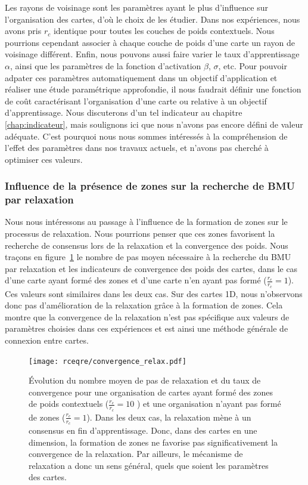 \documentclass[../main]{subfiles}
\begin{document}
Les rayons de voisinage sont les paramètres ayant le plus d'influence sur l'organisation des cartes, d'où le choix de les étudier.
Dans nos expériences, nous avons pris $r_c$ identique pour toutes les couches de poids contextuels.
Nous pourrions cependant associer à chaque couche de poids d'une carte un rayon de voisinage différent. 
Enfin, nous pouvons aussi faire varier le taux d'apprentissage $\alpha$, ainsi que les paramètres de la fonction d'activation $\beta$, $\sigma$, etc.
Pour pouvoir adpater ces paramètres automatiquement dans un objectif d'application et réaliser une étude paramétrique approfondie, il nous faudrait définir une fonction de coût caractérisant l'organisation d'une carte ou relative à un objectif d'apprentissage. 
Nous discuterons d'un tel indicateur au chapitre \ref{chap:indicateur}, mais soulignons ici que nous n'avons pas encore défini de valeur adéquate. 
C'est pourquoi nous nous sommes intéressés à la compréhension de l'effet des paramètres dans nos travaux actuels, et n'avons pas cherché à optimiser ces valeurs.


\subsubsection{Influence de la présence de zones sur la recherche de BMU par relaxation}

Nous nous intéressons au passage à l'influence de la formation de zones sur le processus de relaxation.
Nous pourrions penser que ces zones favorisent la recherche de consensus lors de la relaxation et la convergence des poids.
Nous traçons en figure~\ref{fig:conv_rcre} le nombre de pas moyen nécessaire à la recherche du BMU par relaxation et les indicateurs de convergence des poids des cartes, dans le cas d'une carte ayant formé des zones et d'une carte n'en ayant pas formé ($\frac{r_e}{r_c} = 1$). 
Ces valeurs sont similaires dans les deux cas.
Sur des cartes 1D, nous n'observons donc pas d'amélioration de la relaxation grâce à la formation de zones.
Cela montre que la convergence de la relaxation n'est pas spécifique aux valeurs de paramètres choisies dans ces expériences et est ainsi une méthode générale de connexion entre cartes.

\begin{figure}[hb]
	\centering\texttt{[image: rceqre/convergence\_relax.pdf]}
	\caption{\'Evolution du nombre moyen de pas de relaxation et du taux de convergence pour une organisation de cartes ayant formé des zones de poids contextuels ($\frac{r_e}{r_c} = 10$ ) et une organisation n'ayant pas formé de zones ($\frac{r_e}{r_c} = 1$). Dans les deux cas, la relaxation mène à un consensus en fin d'apprentissage.
	Donc, dans des cartes en une dimension, la formation de zones ne favorise pas significativement la convergence de la relaxation. Par ailleurs, le mécanisme de relaxation a donc un sens général, quels que soient les paramètres des cartes. \label{fig:conv_rcre}}
\end{figure}
\end{document}
